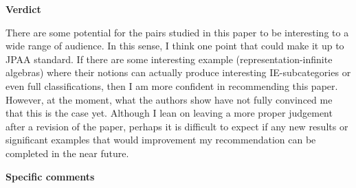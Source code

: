 \documentclass[a4,11pt]{article}
\begin{document}
{\bf Verdict}

There are some potential for the pairs studied in this paper to be interesting to a wide range of audience.  In this sense, I think one point that could make it up to JPAA standard.   If there are some interesting example (representation-infinite algebras) where their notions can actually produce interesting IE-subcategories or even full classifications, then I am more confident in recommending this paper.  However, at the moment, what the authors show have not fully convinced me that this is the case yet.  Although I lean on leaving a more proper judgement after a revision of the paper, perhaps it is difficult to expect if any new results or significant examples  that would improvement my recommendation can be completed  in the near future.


{\bf Specific comments}
\end{document}
